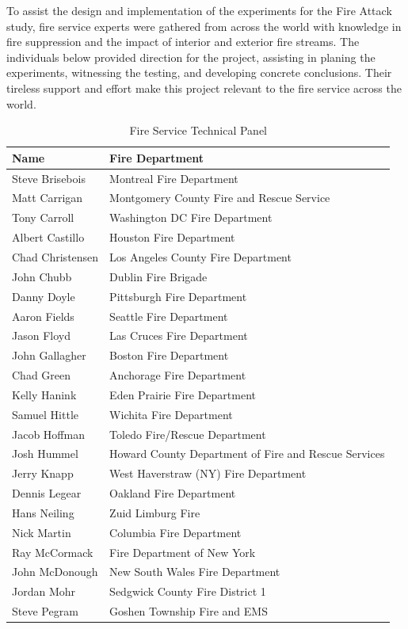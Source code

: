 \documentclass[12pt,oneside]{book}
\begin{document}
\clearpage

To assist the design and implementation of the experiments for the Fire Attack study, fire service experts were gathered from across the world with knowledge in fire suppression and the impact of interior and exterior fire streams. The individuals below provided direction for the project, assisting in planing the experiments, witnessing the testing, and developing concrete conclusions. Their tireless support and effort make this project relevant to the fire service across the world. 


\begin{table}[!ht]
	\centering
	\caption*{Fire Service Technical Panel}
	\begin{tabular}{ll}
		\toprule[1.5pt]
		Name & Fire Department \\ 
		\midrule
		Steve Brisebois  & Montreal Fire Department \\ 
		Matt Carrigan    & Montgomery County Fire and Rescue Service \\ 
		Tony Carroll     & Washington DC Fire Department \\ 
		Albert Castillo  & Houston Fire Department \\ 
		Chad Christensen & Los Angeles County Fire Department \\ 
		John Chubb       & Dublin Fire Brigade \\ 		 		  
		Danny Doyle      & Pittsburgh Fire Department \\ 
		Aaron Fields     & Seattle Fire Department \\ 
		Jason Floyd      & Las Cruces Fire Department \\ 
		John Gallagher   & Boston Fire Department \\ 
		Chad Green       & Anchorage Fire Department \\ 
		Kelly Hanink     & Eden Prairie Fire Department \\ 
		Samuel Hittle    & Wichita Fire Department \\ 
		Jacob Hoffman    & Toledo Fire/Rescue Department \\ 
		Josh Hummel      & Howard County Department of Fire and Rescue Services \\ 
		Jerry Knapp      & West Haverstraw (NY) Fire Department \\ 
		Dennis Legear    & Oakland Fire Department \\ 
		Hans Neiling     & Zuid Limburg Fire \\ 
		Nick Martin      & Columbia Fire Department \\ 
		Ray McCormack    & Fire Department of New York \\ 
		John McDonough   & New South Wales Fire Department \\ 
		Jordan Mohr      & Sedgwick County Fire District 1 \\ 
		Steve Pegram     & Goshen Township Fire and EMS \\ 
		\bottomrule[1.25pt]
	\end{tabular}
\end{table}
\end{document}
